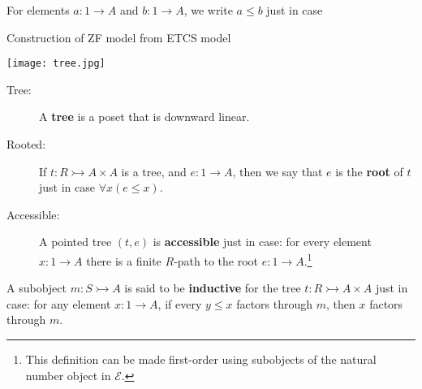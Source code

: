 \documentclass[ignorenonframetext,fleqn]{beamer}
\newcommand{\2}{\mathcal}
\begin{document}
\begin{frame}

  For elements $a:1\to A$ and $b:1\to A$, we write $a\leq b$ just in
  case

  \bigskip {}




\end{frame}

\begin{frame}{Construction of ZF model from ETCS model}

  \texttt{[image: tree.jpg]}


\end{frame}
 

\begin{frame}


   \begin{description}
   \item[Tree:] A \textbf{tree} is a poset that is downward linear.
   \item[Rooted:] If $t:R\rightarrowtail A\times A$ is a tree, and
     $e:1\to A$, then we say that $e$ is the \textbf{root} of $t$ just
     in case $\forall x(e\leq x)$.
   \item[Accessible:] A pointed tree $(t,e)$ is \textbf{accessible}
     just in case: for every element $x:1\to A$ there is a finite
     $R$-path to the root $e:1\to A$.\footnote{This definition can be made
     first-order using subobjects of the natural number object in
     $\2E$.}
   \end{description}

\end{frame}

\begin{frame}

  A subobject $m:S\rightarrowtail A$ is said to be \textbf{inductive}
  for the tree $t:R\rightarrowtail A\times A$ just in case: for any
  element $x:1\to A$, if every $y\leq x$ factors through $m$, then $x$
  factors through $m$.


\end{frame}
 
\end{document}
